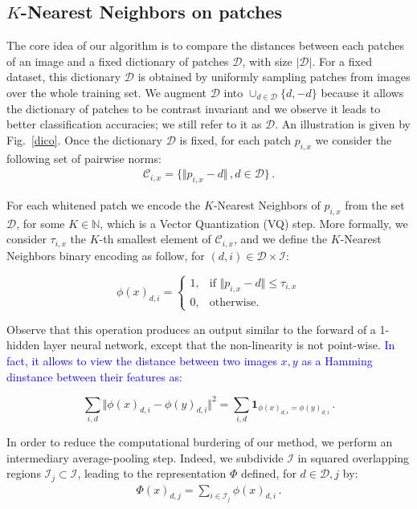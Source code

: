 \documentclass{article}
\newcommand{\Edouard}[1]{\textcolor{blue}{#1}}
\begin{document}
\subsection{$K$-Nearest Neighbors on patches}
The core idea of our algorithm is to compare the distances between each patches of an image and a fixed dictionary of patches $\mathcal{D}$, with size $|\mathcal{D}|$.
For a fixed dataset, this dictionary $\mathcal{D}$ is obtained by uniformly sampling patches from images over the whole training set. We augment $\mathcal{D}$ into $\cup_{d\in \mathcal{D}}\{d,-d\}$ because it allows the dictionary of patches to be contrast invariant and we observe it leads to better classification accuracies; we still refer to it as $\mathcal{D}$. An illustration is given by Fig.~\ref{dico}. Once the dictionary $\mathcal{D}$ is fixed, for each patch $p_{i,x}$ we consider the following set of  pairwise norms:
\begin{align}\mathcal{C}_{i, x} =\{\Vert p_{i, x} - d \Vert\,, d\in\mathcal{D} \}\,.\end{align}

 
For each whitened patch we encode the $K$-Nearest Neighbors of $p_{i,x}$ from the set $\mathcal{D}$, for some $ K \in \mathbb{N}$, which is a Vector Quantization (VQ) step.
More formally, we consider $\tau_{i,x}$ the $K$-th smallest  element of $\mathcal{C}_{i,x}$, and we define the $K$-Nearest Neighbors binary encoding as follow, for $(d,i)\in\mathcal{D}\times\mathcal{I}$:


\begin{equation}
\label{encoding}
\phi(x)_{d,i}=
\begin{cases}
1,&\text{if } \Vert  p_{i,x} - d\Vert \leq \tau_{i,x}\\
0,&\text{otherwise}.
\end{cases}
\end{equation}






Observe that this operation produces an output similar to the forward of a 1-hidden layer neural network, except that the non-linearity is not point-wise. \Edouard{In fact, it allows to view the distance between two images $x,y$ as a Hamming dinstance between their features as}:

\[\sum_{i,d}\Vert \phi(x)_{d,i}-\phi(y)_{d,i}\Vert^2=\sum_{i,d}\mathbf{1}_{\phi(x)_{d,i}=\phi(y)_{d,i}}\,.\]

In order to reduce the computational burdering of our method, we perform an intermediary average-pooling step.
Indeed, we subdivide $\mathcal{I}$ in squared overlapping regions $\mathcal{I}_j\subset\mathcal{I}$, leading to the representation $\Phi$ defined, for $d\in\mathcal{D}, j$ by:
\begin{align}\Phi(x)_{d,j}= \sum_{i\in \mathcal{I}_j}\phi(x)_{d,i}\,.\end{align}
\end{document}
